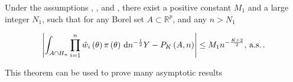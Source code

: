 \begin{thm}
\label{thm:main-theorem}Under the assumptions ,
,  and ,
there exist a positive constant $M_{1}$ and a large integer $N_{1}$,
such that for any Borel set $A\subset\mathbb{R}^{p}$, and any $n>N_{1}$%
\begin{comment}
add subscript to constant
\end{comment}
{} 
\[
\left|\int_{A\cap H_{n}}\prod_{i=1}^{n}\hat{w}_{i}\left(\theta\right)\pi\left(\theta\right)\,\mathrm{d} n^{-\frac{1}{2}}Y-P_{K}\left(A,n\right)\right|\le M_{1}n^{-\frac{K+2}{2}},\,\mathrm{a.s.}\,.
\]

\end{thm}
\begin{comment}
add main theorem
\end{comment}
This theorem can be used to prove many asymptotic results

